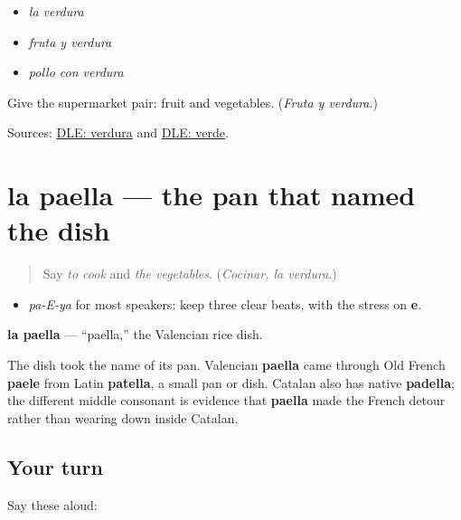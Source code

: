 \begin{itemize}
\raggedright
  \item \emph{la verdura}
  \item \emph{fruta y verdura}
  \item \emph{pollo con verdura}
\end{itemize}

\begin{tcolorbox}[breakable,colback=teal!4,colframe=teal!35!black,title={Before you move on}]
Give the supermarket pair: fruit and vegetables. (\emph{Fruta y verdura}.)

Sources: \href{https://dle.rae.es/verdura}{DLE: verdura} and \href{https://dle.rae.es/verde}{DLE: verde}.
\end{tcolorbox}
\section[la paella]{la paella — the pan that named the dish}

\label{lesson:ES-C403-paella}



\begin{quote}
Say \emph{to cook} and \emph{the vegetables}. (\emph{Cocinar, la verdura}.)
\end{quote}

\begin{sounds}
\begin{itemize}
\raggedright
  \item \emph{pa-E-ya} for most speakers: keep three clear beats, with the stress on \textbf{e}.
\end{itemize}
\end{sounds}

\begin{cousinweb}
\textbf{la paella} — “paella,” the Valencian rice dish.

The dish took the name of its pan. Valencian \textbf{paella} came through Old French \textbf{paele} from Latin \textbf{patella}, a small pan or dish. Catalan also has native \textbf{padella}; the different middle consonant is evidence that \textbf{paella} made the French detour rather than wearing down inside Catalan.
\end{cousinweb}

\subsection*{Your turn}
Say these aloud:

